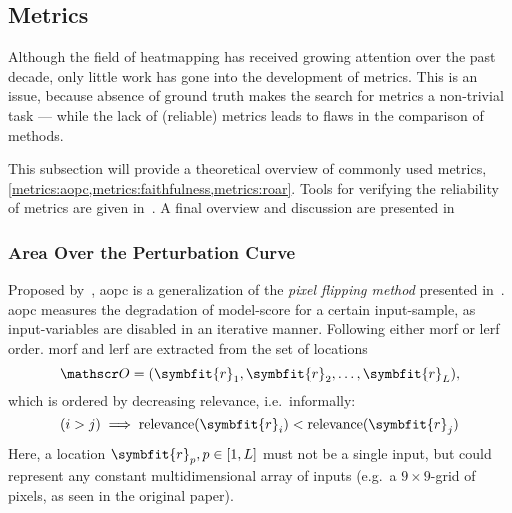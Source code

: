 \subsection{Metrics}
Although the field of heatmapping has received growing attention over the past decade, only little work has gone into the development of metrics. This is an issue, because absence of ground truth makes the search for metrics a non-trivial task --- while the lack of (reliable) metrics leads to flaws in the comparison of methods.

This subsection will provide a theoretical overview of commonly used metrics, \cref{metrics:aopc,metrics:faithfulness,metrics:roar}. Tools for verifying the reliability of metrics are given in~. A final overview and discussion are presented in~

\subsubsection{Area Over the Perturbation Curve}\label{metrics:aopc} Proposed by~, \gls{aopc} is a generalization of the \textit{pixel flipping method} presented in~\cite[pp. 34ff.]{Bach.2015}. \gls{aopc} measures the degradation of model-score for a certain input-sample, as input-variables are disabled in an iterative manner. Following either \gls{morf} or \gls{lerf} order. \gls{morf} and \gls{lerf} are extracted from the set of locations \[ \mathscr O = (\symbfit{r}_1, \symbfit{r}_2, \dots, \symbfit{r}_L), \]  which is ordered by decreasing relevance, i.e.\ informally: \[(i > j) \implies \text{relevance}(\symbfit{r}_i) < \text{relevance}(\symbfit{r}_j) \] Here, a location \( \symbfit{r}_p, p \in [1, L] \) must not be a single input, but could represent any constant multidimensional array of inputs (e.g.\ a \( 9\times9 \)-grid of pixels, as seen in the original paper).

